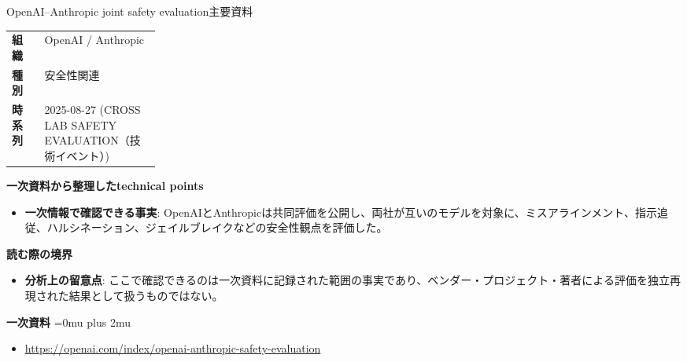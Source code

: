 \begin{technicalnote}{OpenAI–Anthropic joint safety evaluation}{主要資料}
\begingroup
\begin{tabularx}{\linewidth}{@{}>{\bfseries}p{0.22\linewidth}X@{}}
組織 & OpenAI / Anthropic \\
種別 & 安全性関連 \\
時系列 & 2025-08-27 (CROSS LAB SAFETY EVALUATION（技術イベント）) \\
\end{tabularx}
\smallskip
{\bfseries 一次資料から整理したtechnical points}
\begin{itemize}[leftmargin=1.5em,itemsep=0.35em]
\item \textbf{一次情報で確認できる事実}: OpenAIとAnthropicは共同評価を公開し、両社が互いのモデルを対象に、ミスアラインメント、指示追従、ハルシネーション、ジェイルブレイクなどの安全性観点を評価した。
\end{itemize}
\begin{minipage}{\linewidth}
{\bfseries 読む際の境界}
\begin{itemize}[leftmargin=1.5em,itemsep=0.35em]
\item \textbf{分析上の留意点}: ここで確認できるのは一次資料に記録された範囲の事実であり、ベンダー・プロジェクト・著者による評価を独立再現された結果として扱うものではない。
\end{itemize}
\begin{samepage}
{\bfseries 一次資料}
\begingroup\sloppy
\Urlmuskip=0mu plus 2mu\relax
\begin{itemize}[leftmargin=1.5em,itemsep=0.25em]
\item {\scriptsize\url{https://openai.com/index/openai-anthropic-safety-evaluation}}
\end{itemize}
\endgroup
\end{samepage}
\end{minipage}
\endgroup
\end{technicalnote}
\medskip

